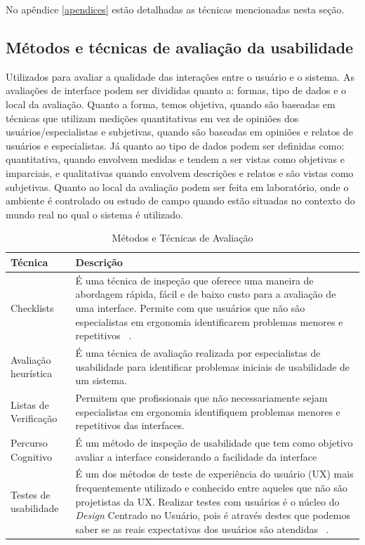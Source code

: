 No apêndice \ref{apendices} estão detalhadas as técnicas mencionadas nesta seção.

\subsection{Métodos e técnicas de avaliação da usabilidade}

Utilizados para avaliar a qualidade das interações entre o usuário e o sistema.
%
As avaliações de interface podem ser divididas quanto a: formas, tipo de dados e o local da avaliação. Quanto a forma, temos objetiva, quando são baseadas em técnicas que utilizam medições quantitativas em vez de opiniões dos usuários/especialistas e subjetivas, quando são baseadas em opiniões e relatos de usuários e especialistas. Já quanto ao tipo de dados podem ser definidas como: quantitativa, quando envolvem medidas e tendem a ser vistas como objetivas e imparciais, e qualitativas quando envolvem descrições e relatos e são vistas como subjetivas. Quanto ao local da avaliação podem ser feita em laboratório, onde o ambiente é controlado ou estudo de campo quando estão situadas no contexto do mundo real no qual o sistema é utilizado.


\begin{table}[h]
\begin{tabular}{|p{4cm}|p{8cm}|}
\hline 
Técnica & Descrição \\ 
\hline 
Checklists & É uma técnica de inspeção que oferece uma maneira de abordagem rápida, fácil e de baixo custo para a avaliação de uma interface. Permite com que usuários que não são especialistas em ergonomia identificarem problemas menores e repetitivos ~\cite{cybis2010}. \\ 
\hline 
Avaliação heurística & É uma técnica de avaliação realizada por especialistas de usabilidade para identificar problemas iniciais de usabilidade de um sistema. \\ 
\hline 
Listas de Verificação & Permitem que profissionais que não necessariamente sejam especialistas em ergonomia identifiquem problemas menores e repetitivos das interfaces. \\ 
\hline 
Percurso Cognitivo & É um método de inspeção de usabilidade que tem como objetivo avaliar a interface considerando a facilidade da interface \\ 
\hline 
Testes de usabilidade & É um dos métodos de teste de experiência do usuário (UX) mais frequentemente utilizado e conhecido entre aqueles que não são projetistas da UX. Realizar testes com usuários é o núcleo do \emph{Design} Centrado no Usuário, pois é através destes que podemos saber se as reais expectativas dos usuários são atendidas ~\cite{santos2012}. \\ 
\hline 
\end{tabular} 
\caption{Métodos e Técnicas de Avaliação}
\end{table}



